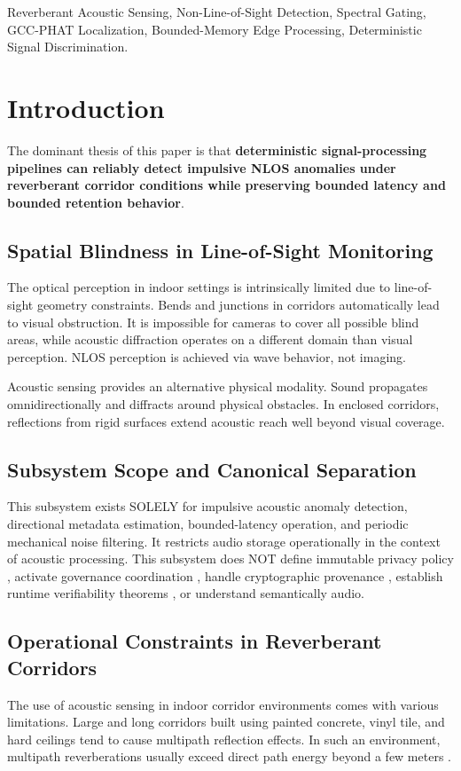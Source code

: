 \documentclass[conference]{IEEEtran}
\begin{document}
\begin{IEEEkeywords}
Reverberant Acoustic Sensing, Non-Line-of-Sight Detection, Spectral Gating, GCC-PHAT Localization, Bounded-Memory Edge Processing, Deterministic Signal Discrimination.
\end{IEEEkeywords}

\section{Introduction}

The dominant thesis of this paper is that \textbf{deterministic signal-processing pipelines can reliably detect impulsive NLOS anomalies under reverberant corridor conditions while preserving bounded latency and bounded retention behavior}.

\subsection{Spatial Blindness in Line-of-Sight Monitoring}
The optical perception in indoor settings is intrinsically limited due to line-of-sight geometry constraints. Bends and junctions in corridors automatically lead to visual obstruction. It is impossible for cameras to cover all possible blind areas, while acoustic diffraction operates on a different domain than visual perception. NLOS perception is achieved via wave behavior, not imaging.

Acoustic sensing provides an alternative physical modality. Sound propagates omnidirectionally and diffracts around physical obstacles. In enclosed corridors, reflections from rigid surfaces extend acoustic reach well beyond visual coverage.

\subsection{Subsystem Scope and Canonical Separation}
This subsystem exists SOLELY for impulsive acoustic anomaly detection, directional metadata estimation, bounded-latency operation, and periodic mechanical noise filtering. It restricts audio storage operationally in the context of acoustic processing. This subsystem does NOT define immutable privacy policy , activate governance coordination , handle cryptographic provenance , establish runtime verifiability theorems , or understand semantically audio.

\subsection{Operational Constraints in Reverberant Corridors}
The use of acoustic sensing in indoor corridor environments comes with various limitations. Large and long corridors built using painted concrete, vinyl tile, and hard ceilings tend to cause multipath reflection effects. In such an environment, multipath reverberations usually exceed direct path energy beyond a few meters \cite{b25}.
\end{document}

